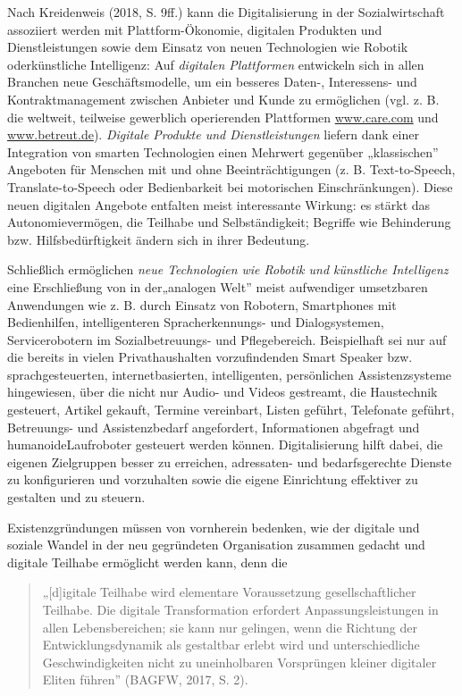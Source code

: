 \documentclass[
  letterpaper,
]{book}
\begin{document}
Nach Kreidenweis (2018, S. 9ff.) kann die Digitalisierung in der
Sozialwirtschaft assoziiert werden mit Plattform-Ökonomie, digitalen
Produkten und Dienstleistungen sowie dem Einsatz von neuen Technologien
wie Robotik oderkünstliche Intelligenz: Auf \emph{digitalen Plattformen
}entwickeln sich in allen Branchen neue Geschäftsmodelle, um ein
besseres Daten-, Interessens- und Kontraktmanagement zwischen Anbieter
und Kunde zu ermöglichen (vgl. z. B. die weltweit, teilweise gewerblich
operierenden Plattformen \href{http://www.care.com/}{www.care.com} und
\href{http://www.betreut.de/}{www.betreut.de}). \emph{Digitale Produkte
und Dienstleistungen }liefern dank einer Integration von smarten
Technologien einen Mehrwert gegenüber „klassischen'' Angeboten für
Menschen mit und ohne Beeinträchtigungen (z. B. Text-to-Speech,
Translate-to-Speech oder Bedienbarkeit bei motorischen Einschränkungen).
Diese neuen digitalen Angebote entfalten meist interessante Wirkung: es
stärkt das Autonomievermögen, die Teilhabe und Selbständigkeit; Begriffe
wie Behinderung bzw. Hilfsbedürftigkeit ändern sich in ihrer Bedeutung.

Schließlich ermöglichen \emph{neue Technologien wie Robotik und
künstliche Intelligenz }eine Erschließung von in der„analogen Welt''
meist aufwendiger umsetzbaren Anwendungen wie z. B. durch Einsatz von
Robotern, Smartphones mit Bedienhilfen, intelligenteren
Spracherkennungs- und Dialogsystemen, Servicerobotern im
Sozialbetreuungs- und Pflegebereich. Beispielhaft sei nur auf die
bereits in vielen Privathaushalten vorzufindenden Smart Speaker bzw.
sprachgesteuerten, internetbasierten, intelligenten, persönlichen
Assistenzsysteme hingewiesen, über die nicht nur Audio- und Videos
gestreamt, die Haustechnik gesteuert, Artikel gekauft, Termine
vereinbart, Listen geführt, Telefonate geführt, Betreuungs- und
Assistenzbedarf angefordert, Informationen abgefragt und
humanoideLaufroboter gesteuert werden können. Digitalisierung hilft
dabei, die eigenen Zielgruppen besser zu erreichen, adressaten- und
bedarfsgerechte Dienste zu konfigurieren und vorzuhalten sowie die
eigene Einrichtung effektiver zu gestalten und zu steuern.

Existenzgründungen müssen von vornherein bedenken, wie der digitale und
soziale Wandel in der neu gegründeten Organisation zusammen gedacht und
digitale Teilhabe ermöglicht werden kann, denn die~

\begin{quote}
„{[}d{]}igitale Teilhabe wird elementare Voraussetzung
gesellschaftlicher Teilhabe. Die digitale Transformation erfordert
Anpassungsleistungen in allen Lebensbereichen; sie kann nur gelingen,
wenn die Richtung der Entwicklungsdynamik als gestaltbar erlebt wird und
unterschiedliche Geschwindigkeiten nicht zu uneinholbaren Vorsprüngen
kleiner digitaler Eliten führen'' (BAGFW, 2017, S. 2).
\end{quote}
\end{document}
